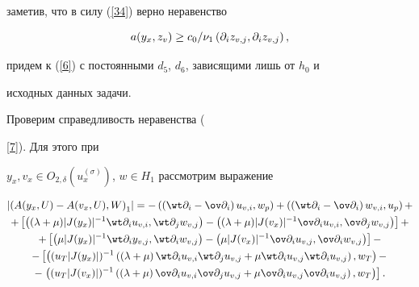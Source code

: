 заметив, что в силу (\ref{34}) верно неравенство


$$


a(y_x,z_v)\geq c_0 / \nu_1 \Scal{\partial_{i}z_{v,j},\partial_{i}z_{v,j}},


$$


придем к (\ref{6}) с постоянными $d_5$, $d_6$, зависящими лишь от $h_0$ и 


исходных данных задачи.





Проверим справедливость неравенства ({\ref{7}). Для этого при


$y_x, v_x \in O_{2,\delta}(u_x^{(\sigma)})$, $w\in H_1$ рассмотрим выражение


\begin{multline}


\label{20'}


\left| \left(A(y_x,U)-A(v_x,U),W\right)_1\right|=


-\Scal{\left( \wt \partial_{i}- \ov \partial_{i}\right) u_{v,i},w_p}+


\Scal{\left( \wt \partial_{i}- \ov \partial_{i}\right)w_{v,i},u_p}+ \\


+\left[{\Scal{(\lambda+\mu)|J(y_x)|^{-1} \wt \partial_{i}u_{v,i},


\wt \partial_{j}w_{v,j}}-\Scal{(\lambda+\mu)|J(v_x)|^{-1}


\ov \partial_{i}u_{v,i},


\ov \partial_{j}w_{v,j}}} \right]  + \\


+\left[ { \Scal{\mu|J(y_x)|^{-1} \wt \partial_{i}y_{v,j},


\wt \partial_{i}w_{v,j}}-\Scal{\mu|J(v_x)|^{-1} \ov \partial_{i}u_{v,j},


\ov \partial_{i}w_{v,j}}} \right]- \\


-\left[ {\Scal{(u_T|J(y_x)|)^{-1}\left(\left(\lambda+\mu \right)


\wt \partial_{i}u_{v,i}\wt \partial_{j}u_{v,j}


+\mu \wt \partial_{i}u_{v,j}\wt \partial_{i}u_{v,j}\right),w_T}-} \right.\\


-\left. {\Scal{(u_T|J(v_x)|)^{-1}\left(\left(\lambda+\mu \right)


\ov \partial_{i}u_{v,i}\ov \partial_{j}u_{v,j}


+\mu \ov \partial_{i}u_{v,j}\ov \partial_{i}u_{v,j}\right),w_T}} \right].



\end{multline}}
